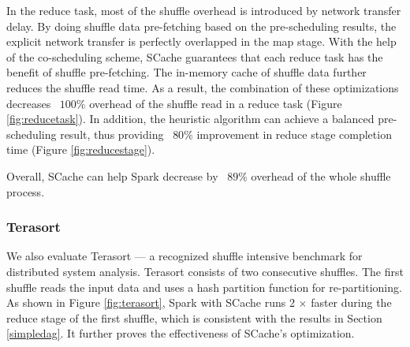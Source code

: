 In the reduce task, most of the shuffle overhead is introduced by network transfer delay. 
By doing shuffle data pre-fetching based on the pre-scheduling results, the explicit network transfer is perfectly overlapped in the map stage. 
With the help of the co-scheduling scheme, SCache guarantees that each reduce task has the benefit of shuffle pre-fetching. 
The in-memory cache of shuffle data further reduces the shuffle read time. 
As a result, the combination of these optimizations decreases ~$100\%$ overhead of the shuffle read in a reduce task (Figure \ref{fig:reducetask}). 
In addition, the heuristic algorithm can achieve a balanced pre-scheduling result, thus providing ~$80\%$ improvement in reduce stage completion time (Figure \ref{fig:reducestage}).

Overall, SCache can help Spark decrease by ~$89\%$ overhead of the whole shuffle process. 

\subsubsection{Terasort}
We also evaluate Terasort\cite{terasort} --- a recognized shuffle intensive benchmark for distributed system analysis. 
Terasort consists of two consecutive shuffles. 
The first shuffle reads the input data and uses a hash partition function for re-partitioning. 
As shown in Figure \ref{fig:terasort}, Spark with SCache runs 2 $\times$ faster during the reduce stage of the first shuffle, which is consistent with the results in Section \ref{simpledag}. 
It further proves the effectiveness of SCache's optimization.

